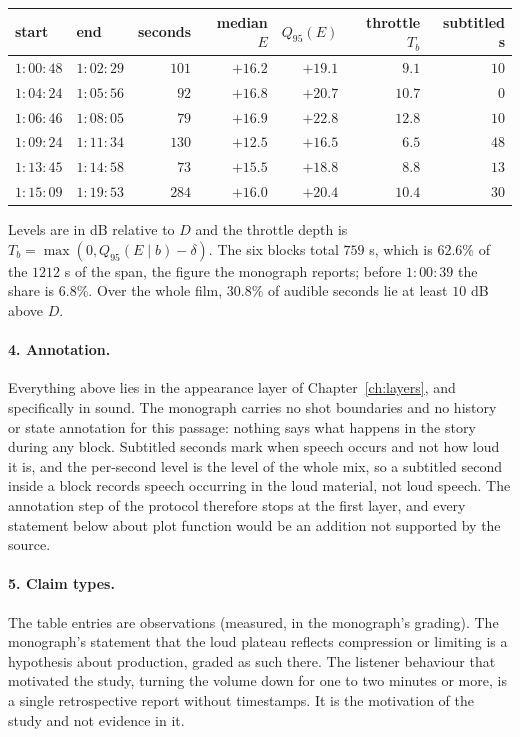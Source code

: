 \begin{center}
\small
\begin{tabular}{llrrrrr}
\toprule
start & end & seconds & median $E$ & $Q_{95}(E)$ & throttle $T_b$ & subtitled s\\
\midrule
$1{:}00{:}48$ & $1{:}02{:}29$ & $101$ & $+16.2$ & $+19.1$ & $9.1$ & $10$\\
$1{:}04{:}24$ & $1{:}05{:}56$ & $92$ & $+16.8$ & $+20.7$ & $10.7$ & $0$\\
$1{:}06{:}46$ & $1{:}08{:}05$ & $79$ & $+16.9$ & $+22.8$ & $12.8$ & $10$\\
$1{:}09{:}24$ & $1{:}11{:}34$ & $130$ & $+12.5$ & $+16.5$ & $6.5$ & $48$\\
$1{:}13{:}45$ & $1{:}14{:}58$ & $73$ & $+15.5$ & $+18.8$ & $8.8$ & $13$\\
$1{:}15{:}09$ & $1{:}19{:}53$ & $284$ & $+16.0$ & $+20.4$ & $10.4$ & $30$\\
\bottomrule
\end{tabular}
\end{center}
Levels are in dB relative to $D$ and the throttle depth is $T_b=\max(0,Q_{95}(E\mid b)-\delta)$. The six blocks total $759$ s, which is $62.6\%$ of the $1212$ s of the span, the figure the monograph reports; before $1{:}00{:}39$ the share is $6.8\%$. Over the whole film, $30.8\%$ of audible seconds lie at least $10$ dB above $D$.

\paragraph{4. Annotation.} Everything above lies in the appearance layer of Chapter~\ref{ch:layers}, and specifically in sound. The monograph carries no shot boundaries and no history or state annotation for this passage: nothing says what happens in the story during any block. Subtitled seconds mark when speech occurs and not how loud it is, and the per-second level is the level of the whole mix, so a subtitled second inside a block records speech occurring in the loud material, not loud speech. The annotation step of the protocol therefore stops at the first layer, and every statement below about plot function would be an addition not supported by the source.

\paragraph{5. Claim types.} The table entries are observations (measured, in the monograph's grading). The monograph's statement that the loud plateau reflects compression or limiting is a hypothesis about production, graded as such there. The listener behaviour that motivated the study, turning the volume down for one to two minutes or more, is a single retrospective report without timestamps. It is the motivation of the study and not evidence in it.

